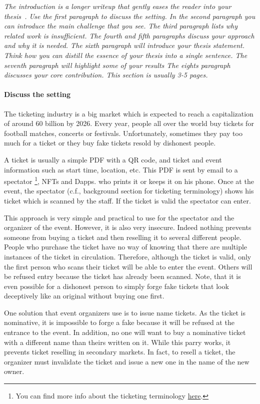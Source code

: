 \documentclass[a4paper,11pt,oneside]{report}
\begin{document}
\textit{The introduction is a longer writeup that gently eases the reader into your
thesis~\cite{dinesh20oakland}. Use the first paragraph to discuss the setting.
In the second paragraph you can introduce the main challenge that you see.
The third paragraph lists why related work is insufficient.
The fourth and fifth paragraphs discuss your approach and why it is needed.
The sixth paragraph will introduce your thesis statement. Think how you can
distill the essence of your thesis into a single sentence.
The seventh paragraph will highlight some of your results
The eights paragraph discusses your core contribution.
This section is usually 3-5 pages.} \\


\paragraph{Discuss the setting} The ticketing industry is a big market which is expected to reach a capitalization of around 60 billion by 2026. Every year, people all over the world buy tickets for football matches, concerts or festivals. Unfortunately, sometimes they pay too much for a ticket or they buy fake tickets resold by dishonest people.

A ticket is usually a simple PDF with a QR code, and ticket and event information such as start time, location, etc. This PDF is sent by email to a spectator \footnote{You can find more info about the ticketing terminology \hyperref[sec:ticketing_terminology]{here}.}, NFTs and Dapps. who prints it or keeps it on his phone. Once at the event, the spectator (c.f., background section for ticketing terminology) shows his ticket which is scanned by the staff. If the ticket is valid the spectator can enter.

This approach is very simple and practical to use for the spectator and the organizer of the event. However, it is also very insecure. Indeed nothing prevents someone from buying a ticket and then reselling it to several different people. People who purchase the ticket have no way of knowing that there are multiple instances of the ticket in circulation. Therefore, although the ticket is valid, only the first person who scans their ticket will be able to enter the event. Others will be refused entry because the ticket has already been scanned. Note, that it is even possible for a dishonest person to simply forge fake tickets that look deceptively like an original without buying one first.

One solution that event organizers use is to issue name tickets. As the ticket is nominative, it is impossible to forge a fake because it will be refused at the entrance to the event. In addition, no one will want to buy a nominative ticket with a different name than theirs written on it. While this parry works, it prevents ticket reselling in secondary markets. In fact, to resell a ticket, the organizer must invalidate the ticket and issue a new one in the name of the new owner.
\end{document}
